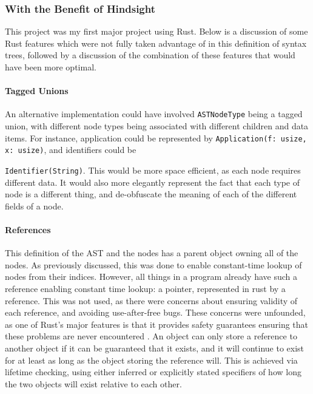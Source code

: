 \subsubsection{With the Benefit of Hindsight}
This project was my first major project using Rust. Below is a discussion of some Rust features which were not fully taken advantage of in this definition of syntax trees, followed by a discussion of the combination of these features that would have been more optimal. 

\paragraph{Tagged Unions}
An alternative implementation could have involved \verb|ASTNodeType| being a tagged union, with different node types being associated with different children and data items. For instance, application could be represented by \verb|Application(f: usize, x: usize)|, and identifiers could be 

\noindent\verb|Identifier(String)|. This would be more space efficient, as each node requires different data. It would also more elegantly represent the fact that each type of node is a different thing, and de-obfuscate the meaning of each of the different fields of a node. 

\paragraph{References}
This definition of the AST and the nodes has a parent object owning all of the nodes. As previously discussed, this was done to enable constant-time lookup of nodes from their indices. However, all things in a program already have such a reference enabling constant time lookup: a pointer, represented in rust by a reference. This was not used, as there were concerns about ensuring validity of each reference, and avoiding use-after-free bugs. These concerns were unfounded, as one of Rust's major features is that it provides safety guarantees ensuring that these problems are never encountered \cite{rust_book}. An object can only store a reference to another object if it can be guaranteed that it exists, and it will continue to exist for at least as long as the object storing the reference will. This is achieved via lifetime checking, using either inferred or explicitly stated specifiers of how long the two objects will exist relative to each other. 

